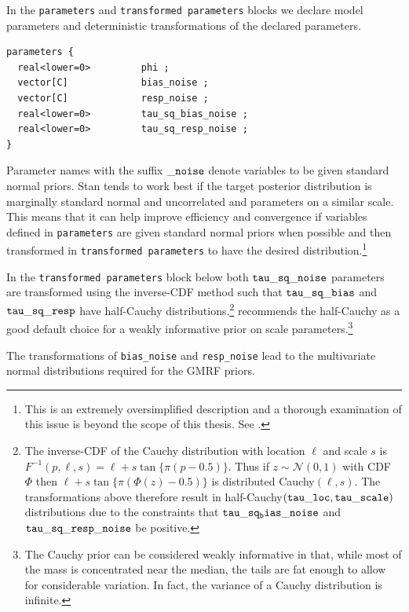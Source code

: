 In the {\tt parameters} and {\tt transformed parameters} blocks we declare model parameters and deterministic transformations of the declared parameters. 

\begin{singlespacing}
\small
\begin{verbatim}
parameters {
  real<lower=0>         phi ;
  vector[C]             bias_noise ;
  vector[C]             resp_noise ;
  real<lower=0>         tau_sq_bias_noise ;
  real<lower=0>         tau_sq_resp_noise ;
}
\end{verbatim}
\end{singlespacing}


\noindent Parameter names with the suffix ${\tt \_noise}$ denote variables to be given standard normal priors. Stan tends to work best if the target posterior distribution is marginally standard normal and uncorrelated and parameters on a  similar scale. This means that it can help improve efficiency and convergence if variables defined in {\tt parameters} are given standard normal priors when possible and then transformed in {\tt transformed parameters} to have the desired distribution.\footnote{This is an extremely oversimplified description and a thorough examination of this issue is beyond the scope of this thesis. See .} 

In the {\tt transformed parameters} block below both ${\tt tau\_sq\_noise}$ parameters are transformed using the inverse-CDF method such that ${\tt tau\_sq\_bias}$ and ${\tt tau\_sq\_resp}$ have half-Cauchy distributions.\footnote{The inverse-CDF of the Cauchy distribution with location $\ell$ and scale $s$ is $F^{-1}(p, \ell,s)  = \ell + s \tan{\{ \pi (p - 0.5)\}}$. Thus if $z \sim \mathcal{N}(0,1)$ with CDF $\Phi$ then $\ell + s \tan{\{ \pi (\Phi(z) - 0.5)\}}$ is distributed Cauchy$(\ell, s)$. The transformations above therefore result in half-Cauchy$({\tt tau\_loc}, {\tt tau\_scale})$ distributions due to the constraints that ${\tt tau\_sq_bias\_noise}$ and ${\tt tau\_sq\_resp\_noise}$ be positive.}  recommends the half-Cauchy as a good default choice for a weakly informative prior on scale parameters.\footnote{The Cauchy prior can be considered weakly informative in that, while most of the mass is concentrated near the median, the tails are fat enough to allow for considerable variation. In fact, the variance of a Cauchy distribution is infinite.}

The transformations of {\tt bias\_noise} and {\tt resp\_noise} lead to the multivariate normal distributions required for the GMRF priors. 

